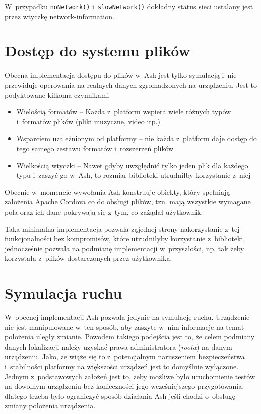\documentclass[brudnopis]{xmgr}
\begin{document}
W~przypadku \texttt{noNetwork()} i~\texttt{slowNetwork()} dokładny status sieci ustalany jest przez wtyczkę network-information.

\section{Dostęp do systemu plików}

Obecna implementacja dostępu do plików w~Ash jest tylko symulacją i~nie przewiduje operowania na realnych danych zgromadzonych na urządzeniu. Jest to podyktowane kilkoma czynnikami

\begin{itemize}
  \item Wielością formatów -- Każda z~platform wspiera wiele różnych typów i~formatów plików (pliki muzyczne, video itp.) 
  \item Wsparciem uzależnionym od platformy -- nie każda z~platform daje dostęp do tego samego zestawu formatów i~rozszerzeń plików
  \item Wielkością wtyczki -- Nawet gdyby uwzględnić tylko jeden plik dla każdego typu i~zaszyć go w~Ash, to rozmiar biblioteki utrudniłby korzystanie z~niej
\end{itemize}

Obecnie w~momencie wywołania Ash konstruuje obiekty, który spełniają założenia Apache Cordova co do obsługi plików, tzn. mają wszystkie wymagane pola oraz ich dane pokrywają się z~tym, co zażądał użytkownik. 

Taka minimalna implementacja pozwala ząjednej strony  nakorzystanie z~tej funkcjonalności bez kompromisów, które utrudniłyby korzystanie z~biblioteki, jednocześnie pozwala na podmianę implementacji w~przyszłości, np. tak żeby korzystała z~plików dostarczonych przez użytkownika.

\section{Symulacja ruchu}

W~obecnej implementacji Ash pozwala jedynie na symulację ruchu. Urządzenie nie jest manipulowane w~ten sposób, aby zaszyte w~nim informacje na temat położenia uległy zmianie. Powodem takiego podejścia jest to, że celem podmiany danych lokalizacji należy uzyskać prawa administratora (\textit{roota}) na danym urządzeniu. Jako, że wiąże się to z~potencjalnym naruszeniem bezpieczeństwa i~stabilności platformy na większości urządzeń jest to domyślnie wyłączone. Jednym z~podstawowych założeń jest to, żeby możliwe było uruchomienie testów na dowolnym urządzeniu bez konieczności jego wcześniejszego przygotowania, dlatego trzeba było ograniczyć sposób działania Ash jeśli chodzi o~obsługę zmiany położenia urządzenia. 
\end{document}
